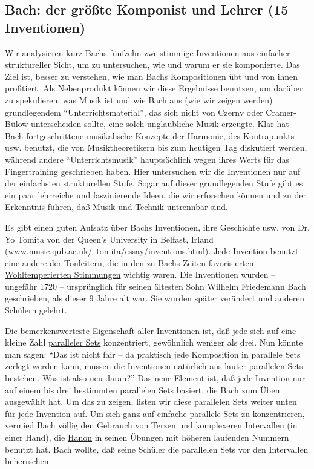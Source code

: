 
\subsection{Bach: der größte Komponist und Lehrer (15 Inventionen)}
\label{c1iii20} 

Wir analysieren kurz Bachs fünfzehn zweistimmige Inventionen aus einfacher struktureller Sicht, um zu untersuchen, wie und warum er sie komponierte.
Das Ziel ist, besser zu verstehen, wie man Bachs Kompositionen übt und von ihnen profitiert.
Als Nebenprodukt können wir diese Ergebnisse benutzen, um darüber zu spekulieren, was Musik ist und wie Bach aus (wie wir zeigen werden) grundlegendem \enquote{Unterrichtsmaterial}, das sich nicht von Czerny oder Cramer-Bülow unterscheiden sollte, eine solch unglaubliche Musik erzeugte.
Klar hat Bach fortgeschrittene musikalische Konzepte der Harmonie, des Kontrapunkts usw. benutzt, die von Musiktheoretikern bis  zum heutigen Tag diskutiert werden, während andere \enquote{Unterrichtsmusik} hauptsächlich wegen ihres Werts für das Fingertraining geschrieben haben.
Hier untersuchen wir die Inventionen nur auf der einfachsten strukturellen Stufe.
Sogar auf dieser grundlegenden Stufe gibt es ein paar lehrreiche und faszinierende Ideen, die wir erforschen können und zu der Erkenntnis führen, daß Musik und Technik untrennbar sind.
 
Es gibt einen guten Aufsatz über Bachs Inventionen, ihre Geschichte usw. von Dr. Yo Tomita von der Queen's University in Belfast, Irland (www.music.qub.ac.uk/~tomita/essay/inventions.html).
Jede Invention benutzt eine andere der Tonleitern, die in den zu Bachs Zeiten favorisierten \hyperref[c2_2_wtk2]{Wohltemperierten Stimmungen} wichtig waren.
Die Inventionen wurden -- ungefähr 1720 -- ursprünglich für seinen ältesten Sohn Wilhelm Friedemann Bach geschrieben, als dieser 9 Jahre alt war.
Sie wurden später verändert und anderen Schülern gelehrt.

Die bemerkenswerteste Eigenschaft aller Inventionen ist, daß jede sich auf eine kleine Zahl \hyperref[c1iii7b]{paralleler Sets} konzentriert, gewöhnlich weniger als drei.
Nun könnte man sagen: \enquote{Das ist nicht fair -- da praktisch jede Komposition in parallele Sets zerlegt werden kann, müssen die Inventionen natürlich aus lauter parallelen Sets bestehen. Was ist also neu daran?}
Das neue Element ist, daß jede Invention nur auf einem bis drei bestimmten parallelen Sets basiert, die Bach zum Üben ausgewählt hat.
Um das zu zeigen, listen wir diese parallelen Sets weiter unten für jede Invention auf.
Um sich ganz auf einfache parallele Sets zu konzentrieren, vermied Bach völlig den Gebrauch von Terzen und komplexeren Intervallen (in einer Hand), die \hyperref[c1iii7h]{Hanon} in seinen Übungen mit höheren laufenden Nummern benutzt hat.
Bach wollte, daß seine Schüler die parallelen Sets vor den Intervallen beherrschen.

